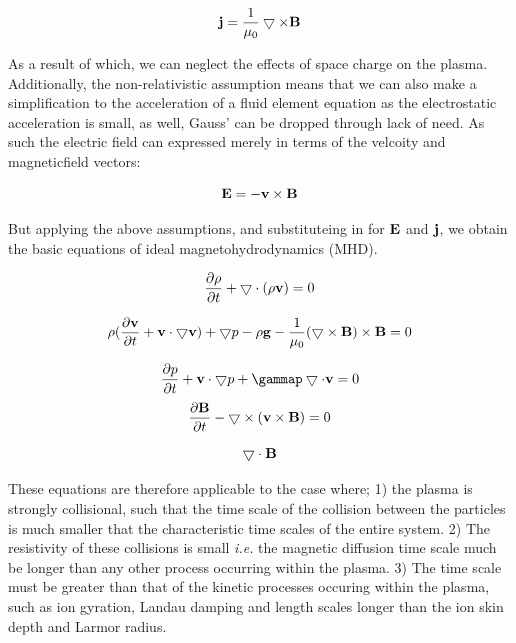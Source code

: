 \begin{equation}
	\mathbf{j} = \frac{1}{\mu_0}\bigtriangledown \times \mathbf{B}
\end{equation}

As a result of which, we can neglect the effects of space charge on the plasma.
Additionally, the non-relativistic assumption means that we can also make a simplification to the acceleration of a fluid element equation as the electrostatic acceleration is small, as well, Gauss' can be dropped through lack of need.
As such the electric field can expressed merely in terms of the velcoity and magneticfield vectors:

\begin{equation}
	\mathbf{E} = -\mathbf{v} \times \mathbf{B}
\end{equation}

But applying the above assumptions, and substituteing in for $\mathbf{E}$ and $\mathbf{j}$, we obtain the basic equations of ideal magnetohydrodynamics (MHD).

\begin{equation}
	\frac{\partial \rho}{\partial t } + \bigtriangledown\cdot(\rho\mathbf{v}) = 0
\end{equation}	

\begin{equation}
	\rho(\frac{\partial \mathbf{v}}{\partial t } + \mathbf{v}\cdot\bigtriangledown{\mathbf{v}}) + \bigtriangledown{p} - \rho\mathbf{g} - \frac{1}{\mu_0}(\bigtriangledown \times \mathbf{B}) \times \mathbf{B} = 0
\end{equation}

\begin{equation}
	\pd{p}{t} + \mb{v}\cdot\divv{p} + \gammap\del\cdot\mb{v} = 0
\end{equation}
\begin{equation}	
	\frac{\partial \mathbf{B}}{\partial t } - \bigtriangledown \times (\mathbf{v} \times \mathbf{B}) = 0
\end{equation}
	
\begin{equation}
	\bigtriangledown\cdot\mathbf{B}
\end{equation}

These equations are therefore applicable to the case where; 1) the plasma is strongly collisional, such that the time scale of the collision between the particles is much smaller that the characteristic time scales of the entire system.
2) The resistivity of these collisions is small \emph{i.e.} the magnetic diffusion time scale much be longer than any other process occurring within the plasma.
3) The time scale must be greater than that of the kinetic processes occuring within the plasma, such as ion gyration, Landau damping and length scales longer than the ion skin depth and Larmor radius.

